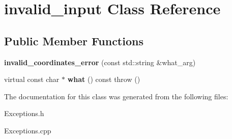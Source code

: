 \hypertarget{classinvalid__input}{
\section{invalid\_\-input Class Reference}
\label{classinvalid__input}
}
\subsection*{Public Member Functions}
\begin{DoxyCompactItemize}
\item 
\hypertarget{classinvalid__input_ad4945c86eaa7eb9470bdfc23e7ea2fb9}{
{\bfseries invalid\_\-coordinates\_\-error} (const std::string \&what\_\-arg)}
\label{classinvalid__input_ad4945c86eaa7eb9470bdfc23e7ea2fb9}

\item 
\hypertarget{classinvalid__input_aafb8b5281994c883712f7be6fc2f6b00}{
virtual const char $\ast$ {\bfseries what} () const   throw ()}
\label{classinvalid__input_aafb8b5281994c883712f7be6fc2f6b00}

\end{DoxyCompactItemize}


The documentation for this class was generated from the following files:\begin{DoxyCompactItemize}
\item 
Exceptions.h\item 
Exceptions.cpp\end{DoxyCompactItemize}
